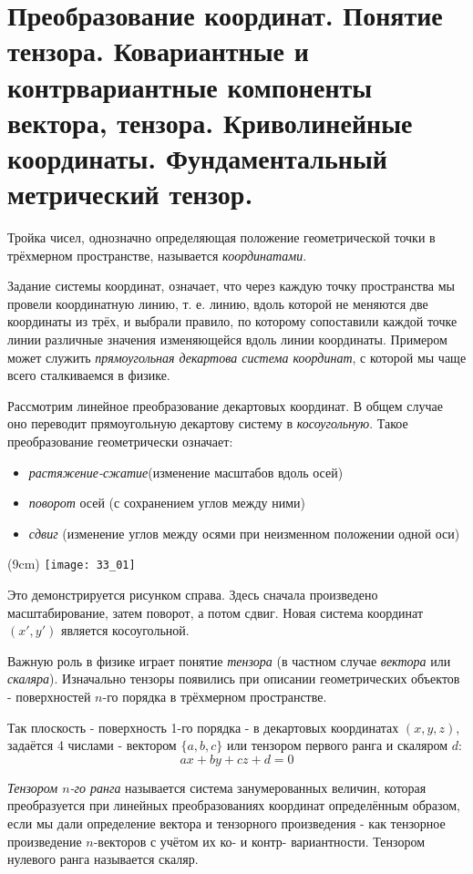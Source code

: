 \chapter{Преобразование координат. Понятие тензора. Ковариантные и
контрвариантные компоненты вектора, тензора. Криволинейные координаты.
Фундаментальный метрический тензор.}

Тройка чисел, однозначно определяющая положение геометрической точки в
трёхмерном пространстве, называется \emph{координатами}. 

Задание системы координат, означает, что через каждую точку пространства мы
провели координатную линию, т. е. линию, вдоль которой не меняются две
координаты из трёх, и выбрали правило, по которому сопоставили каждой точке
линии различные значения изменяющейся вдоль линии координаты. Примером может
служить \emph{прямоугольная декартова система координат}, с которой мы чаще
всего сталкиваемся в физике.

Рассмотрим линейное преобразование декартовых координат. В общем случае оно
переводит прямоугольную декартову систему в \emph{косоугольную}. Такое
преобразование геометрически означает:
    \begin{itemize}
        \item \emph{растяжение-сжатие}(изменение масштабов вдоль осей)
        \item \emph{поворот} осей (с сохранением углов между ними)
        \item \emph{сдвиг} (изменение углов между осями при неизменном
            положении одной оси)
    \end{itemize}
    
\sidefig(9cm)
{\texttt{[image: 33\_01]}}{Это демонстрируется рисунком справа.
Здесь сначала произведено масштабирование, затем поворот, а потом сдвиг. Новая
система координат \( (x', y') \) является косоугольной.

Важную роль в физике играет понятие \emph{тензора} (в частном случае
\emph{вектора} или \emph{скаляра}). Изначально тензоры появились при описании
геометрических объектов - поверхностей \( n \)-го порядка в трёхмерном
пространстве.
}

Так плоскость - поверхность 1-го порядка - в декартовых координатах
\( (x, y, z) \), задаётся 4 числами - вектором \( \{a,b,c\} \) или тензором
первого ранга и скаляром \( d \):
\[
    ax+by+cz+d=0
\]

\emph{Тензором \( n \)-го ранга} называется система занумерованных величин,
которая преобразуется при линейных преобразованиях координат определённым
образом, если мы дали определение вектора и тензорного произведения - как
тензорное произведение \( n \)-векторов с учётом их ко- и контр- вариантности.
Тензором нулевого ранга называется скаляр.

